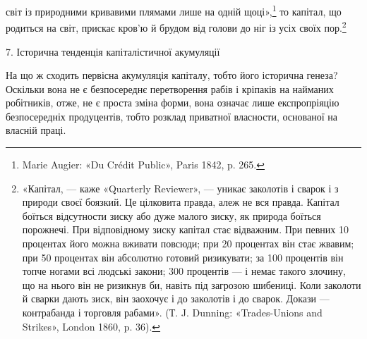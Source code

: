 світ із природними кривавими плямами лише на одній щоці»,\footnote{
Marie Augier: «Du Crédit Public», Paris 1842, p. 265.
}
то капітал, що родиться на світ, прискає кров’ю й брудом від
голови до ніг із усіх своїх пор.\footnote{
«Капітал, — каже «Quarterly Reviewer», — уникає заколотів
і сварок і з природи своєї боязкий. Це цілковита правда, алеж не вся
правда. Капітал боїться відсутности зиску або дуже малого зиску, як
природа боїться порожнечі. При відповідному зиску капітал стає відважним.
При певних 10 процентах його можна вживати повсюди; при 20 процентах
він стає жвавим; при 50 процентах він абсолютно готовий ризикувати;
за 100 процентів він топче ногами всі людські закони; 300 процентів
— і немає такого злочину, що на нього він не ризикнув би, навіть
під загрозою шибениці. Коли заколоти й сварки дають зиск, він заохочує
і до заколотів і до сварок. Докази — контрабанда і торговля рабами».
(Т. J. Dunning: «Trades-Unions and Strikes», London 1860, p. 36).
}

7. Історична тенденція капіталістичної акумуляції

На що ж сходить первісна акумуляція капіталу, тобто його
історична генеза? Оскільки вона не є безпосереднє перетворення
рабів і кріпаків на найманих робітників, отже, не є проста
зміна форми, вона означає лише експропріяцію безпосередніх
продуцентів, тобто розклад приватної власности, основаної на
власній праці.

